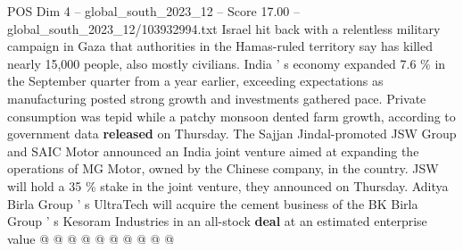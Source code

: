 \begin{textsample}{POS Dim 4 – global\_south\_2023\_12 – Score 17.00 – global\_south\_2023\_12/103932994.txt}
Israel hit back with a relentless military campaign in Gaza that authorities in the Hamas-ruled territory say has killed nearly 15,000 people, also mostly civilians.
India ' s economy expanded 7.6 \% in the September quarter from a year earlier, exceeding expectations as manufacturing posted strong growth and investments gathered pace.
Private consumption was tepid while a patchy monsoon dented farm growth, according to government data \textbf{released} on Thursday.
The Sajjan Jindal-promoted JSW Group and SAIC Motor announced an India joint venture aimed at expanding the operations of MG Motor, owned by the Chinese company, in the country.
JSW will hold a 35 \% stake in the joint venture, they announced on Thursday.
Aditya Birla Group ' s UltraTech will acquire the cement business of the BK Birla Group ' s Kesoram Industries in an all-stock \textbf{deal} at an estimated enterprise value @ @ @ @ @ @ @ @ @ @

\end{textsample}
